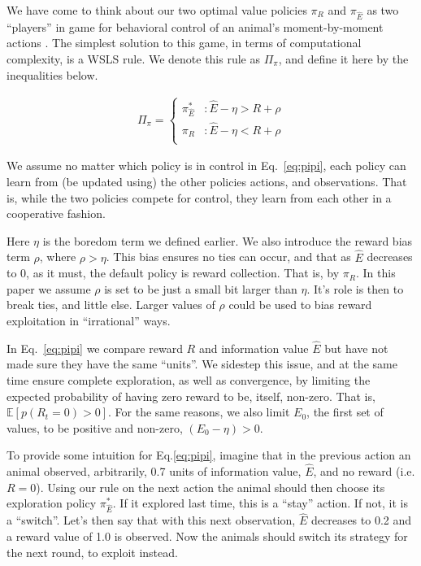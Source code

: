 We have come to think about our two optimal value policies $\pi_R$ and $\pi_{\hat E}$ as two ``players'' in game for behavioral control of an animal's moment-by-moment actions \cite{Estes1994TowardAS}. The simplest solution to this game, in terms of computational complexity, is a WSLS rule. We denote this rule as $\Pi_\pi$, and define it here by the inequalities below. 

\begin{equation} 
    \label{eq:pipi}
    \begin{split}
        \Pi_{\pi} = 
        \begin{cases}
            \pi^*_{\hat{E}} & : \hat{E} - \eta > R + \rho \\
            \pi_R 	& : \hat{E} - \eta < R + \rho \\
        \end{cases}
    \end{split}
\end{equation}

We assume no matter which policy is in control in Eq.~\ref{eq:pipi}, each policy can learn from (be updated using) the other policies actions, and observations. That is, while the two policies compete for control, they learn from each other in a cooperative fashion.

Here $\eta$ is the boredom term we defined earlier. We also introduce the reward bias term $\rho$, where $\rho > \eta$. This bias ensures no ties can occur, and that as $\hat E$ decreases to 0, as it must, the default policy is reward collection. That is, by $\pi_R$. In this paper we assume $\rho$ is set to be just a small bit larger than $\eta$. It's role is then to break ties, and little else. Larger values of $\rho$ could be used to bias reward exploitation in ``irrational'' ways.

In Eq.~\ref{eq:pipi} we compare reward $R$ and information value $\hat E$ but have not made sure they have the same ``units''. We sidestep this issue, and at the same time ensure complete exploration, as well as convergence, by limiting the expected probability of having zero reward to be, itself, non-zero. That is, $\mathbb{E}[p(R_t=0) > 0]$. For the same reasons, we also limit $E_0$, the first set of values, to be positive and non-zero, $(E_0 - \eta) > 0$. 

To provide some intuition for Eq.\ref{eq:pipi}, imagine that in the previous action an animal observed, arbitrarily, 0.7 units of information value, $\hat E$, and no reward (i.e. $R = 0$). Using our rule on the next action the animal should then choose its exploration policy $\pi^*_{\hat{E}}$. If it explored last time, this is a ``stay'' action. If not, it is a ``switch''. Let's then say that with this next observation, $\hat E$ decreases to 0.2 and a reward value of 1.0 is observed. Now the animals should switch its strategy for the next round, to exploit instead. 

